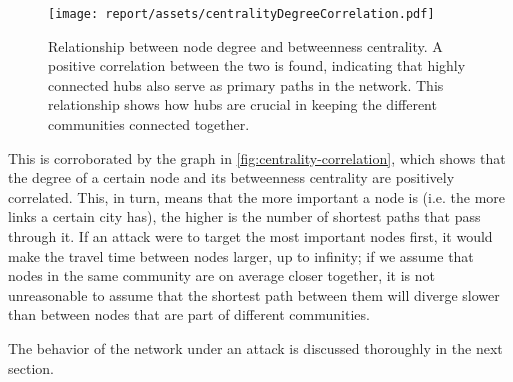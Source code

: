 \begin{figure}
    \centering
    \texttt{[image: report/assets/centralityDegreeCorrelation.pdf]}
    \caption{Relationship between node degree and betweenness centrality.
    A positive correlation between the two is found, indicating that highly connected hubs also serve as primary paths in the network. This relationship shows how hubs are crucial in keeping the different communities connected together.}
    \label{fig:centrality-correlation}
\end{figure}
This is corroborated by the graph in \autoref{fig:centrality-correlation}, which shows that the degree of a certain node and its betweenness centrality are positively correlated. This, in turn, means that the more important a node is (i.e. the more links a certain city has), the higher is the number of shortest paths that pass through it. If an attack were to target the most important nodes first, it would make the travel time between nodes larger, up to infinity; if we assume that nodes in the same community are on average closer together, it is not unreasonable to assume that the shortest path between them will diverge slower than between nodes that are part of different communities.

The behavior of the network under an attack is discussed thoroughly in the next section.